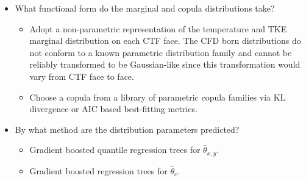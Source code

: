 \documentclass[t, pdftex]{beamer}
\begin{document}
\begin{frame}
{\begin{itemize}
        \item What functional form do the marginal and copula distributions take?
        \begin{itemize}
            \item Adopt a non-parametric representation of the temperature and TKE marginal distribution on each CTF face.  The CFD born distributions do not conform to a known parametric distribution family and cannot be reliably transformed to be Gaussian-like since this transformation would vary from CTF face to face.
            \item Choose a copula from a library of parametric copula families via KL divergence or AIC based best-fitting metrics.
        \end{itemize}        
        \item By what method are the distribution parameters predicted?
        \begin{itemize}
            \item Gradient boosted quantile regression trees for $\hat \theta_{x,y}$.
            \item Gradient boosted regression trees for $\hat \theta_{c}$.
        \end{itemize}
    \end{itemize}
}
\end{frame}

\end{document}

